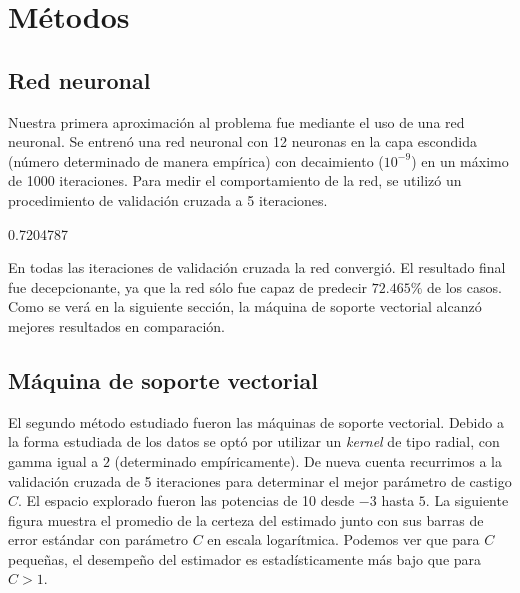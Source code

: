 \documentclass{article}
\begin{document}
\section{Métodos}
\subsection{Red neuronal}
Nuestra primera aproximación al problema fue mediante el uso de una red neuronal. Se entrenó una red neuronal con 12 neuronas en la capa escondida (número determinado de manera empírica) con decaimiento ($10^{-9}$) en un máximo de 1000 iteraciones. Para medir el comportamiento de la red, se utilizó un procedimiento de validación cruzada a 5 iteraciones.
\begin{Schunk}
\begin{Soutput}
[1] 0.7204787
\end{Soutput}
\end{Schunk}
En todas las iteraciones de validación cruzada la red convergió. El resultado final fue decepcionante, ya que la red sólo fue capaz de predecir $72.465\%$ de los casos. Como se verá en la siguiente sección, la máquina de soporte vectorial alcanzó mejores resultados en comparación.

\subsection{Máquina de soporte vectorial}
El segundo método estudiado fueron las máquinas de soporte vectorial. Debido a la forma estudiada de los datos se optó por utilizar un \emph{kernel} de tipo radial, con gamma igual a $2$ (determinado empíricamente). De nueva cuenta recurrimos a la validación cruzada de 5 iteraciones para determinar el mejor parámetro de castigo $C$. El espacio explorado fueron las potencias de 10 desde $-3$ hasta $5$. La siguiente figura muestra el promedio de la certeza del estimado junto con sus barras de error estándar con parámetro $C$ en escala logarítmica. Podemos ver que para $C$ pequeñas, el desempeño del estimador es estadísticamente más bajo que para $C > 1$.
\end{document}

